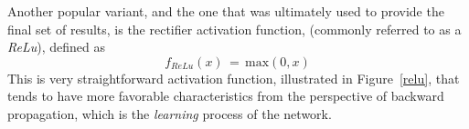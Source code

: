 \documentclass[letterpaper,12pt]{article}
\newcommand{\figref}[1]{Figure~\ref{#1}}
\begin{document}
Another popular variant, and the one that was ultimately used to provide the final set of results, is the rectifier activation function, (commonly referred to as a \textit{ReLu}), defined as
\begin{equation}
f_{ReLu}(x) \, = \, \text{max}(0,x)
\end{equation}
This is very straightforward activation function, illustrated in \figref{relu}, that tends to have more favorable characteristics from the perspective of backward propagation, which is the \textit{learning} process of the network.
\begin{figure}[htbp]
\begin{center}
  \ \ \ \ 

\end{center}
\end{figure}
\end{document}
